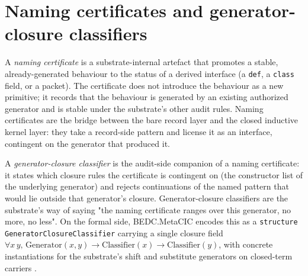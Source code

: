 \section{Naming certificates and generator-closure classifiers}
\label{sec:certificate-closure-naming-certificates}

\begin{definition}
\label{def:certificate-closure-naming-certificate}
A \emph{naming certificate} is a substrate-internal artefact that promotes a stable, already-generated behaviour to the status of a derived interface (a \texttt{def}, a \texttt{class} field, or a \NameCert{} packet). The certificate does not introduce the behaviour as a new primitive; it records that the behaviour is generated by an existing authorized generator and is stable under the substrate's other audit rules. Naming certificates are the bridge between the bare record layer and the closed inductive kernel layer: they take a record-side pattern and license it as an interface, contingent on the generator that produced it.
\end{definition}

\begin{definition}
\label{def:certificate-closure-generator-closure-classifier}
A \emph{generator-closure classifier} is the audit-side companion of a naming certificate: it states which closure rules the certificate is contingent on (the constructor list of the underlying generator) and rejects continuations of the named pattern that would lie outside that generator's closure. Generator-closure classifiers are the substrate's way of saying "the naming certificate ranges over this generator, no more, no less". On the formal side, BEDC.MetaCIC encodes this as a \texttt{structure GeneratorClosureClassifier} carrying a single closure field $\forall x\,y,\, \text{Generator}(x, y) \to \text{Classifier}(x) \to \text{Classifier}(y)$, with concrete instantiations for the substrate's shift and substitute generators on closed-term carriers   .
\end{definition}

